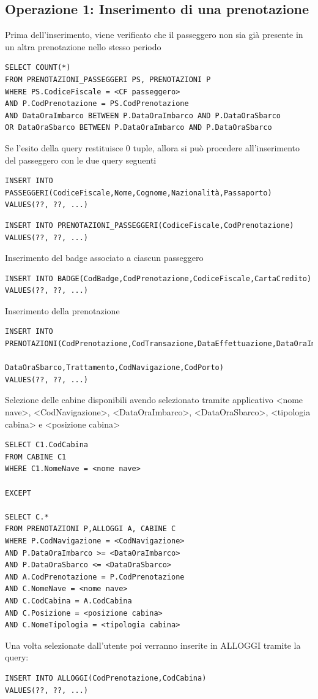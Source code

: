 \documentclass[a4paper, titlepage]{report}
\begin{document}
\subsection*{Operazione 1: Inserimento di una prenotazione}
Prima dell'inserimento, viene verificato che il passeggero non sia già presente in un altra prenotazione nello stesso periodo
\begin{lstlisting}
SELECT COUNT(*)
FROM PRENOTAZIONI_PASSEGGERI PS, PRENOTAZIONI P
WHERE PS.CodiceFiscale = <CF passeggero>
AND P.CodPrenotazione = PS.CodPrenotazione
AND DataOraImbarco BETWEEN P.DataOraImbarco AND P.DataOraSbarco
OR DataOraSbarco BETWEEN P.DataOraImbarco AND P.DataOraSbarco
\end{lstlisting}
Se l'esito della query restituisce 0 tuple, allora si può procedere all'inserimento del passeggero con le due query seguenti

\begin{lstlisting}
INSERT INTO PASSEGGERI(CodiceFiscale,Nome,Cognome,Nazionalità,Passaporto)
VALUES(??, ??, ...)
\end{lstlisting}

\begin{lstlisting}
INSERT INTO PRENOTAZIONI_PASSEGGERI(CodiceFiscale,CodPrenotazione)
VALUES(??, ??, ...)
\end{lstlisting}

Inserimento del badge associato a ciascun passeggero
\begin{lstlisting}
INSERT INTO BADGE(CodBadge,CodPrenotazione,CodiceFiscale,CartaCredito)
VALUES(??, ??, ...)
\end{lstlisting}

Inserimento della prenotazione
\begin{lstlisting}
INSERT INTO PRENOTAZIONI(CodPrenotazione,CodTransazione,DataEffettuazione,DataOraImbarco,
                            DataOraSbarco,Trattamento,CodNavigazione,CodPorto)
VALUES(??, ??, ...)
\end{lstlisting}

Selezione delle cabine disponibili avendo selezionato tramite applicativo <nome nave>, <CodNavigazione>, <DataOraImbarco>, <DataOraSbarco>, <tipologia cabina> e <posizione cabina>
\begin{lstlisting}
SELECT C1.CodCabina
FROM CABINE C1
WHERE C1.NomeNave = <nome nave>

EXCEPT

SELECT C.*
FROM PRENOTAZIONI P,ALLOGGI A, CABINE C
WHERE P.CodNavigazione = <CodNavigazione>
AND P.DataOraImbarco >= <DataOraImbarco>
AND P.DataOraSbarco <= <DataOraSbarco>
AND A.CodPrenotazione = P.CodPrenotazione 
AND C.NomeNave = <nome nave>
AND C.CodCabina = A.CodCabina
AND C.Posizione = <posizione cabina>
AND C.NomeTipologia = <tipologia cabina>
\end{lstlisting}
Una volta selezionate dall'utente poi verranno inserite in ALLOGGI tramite la query:
\begin{lstlisting}
INSERT INTO ALLOGGI(CodPrenotazione,CodCabina)
VALUES(??, ??, ...)
\end{lstlisting}
\end{document}
